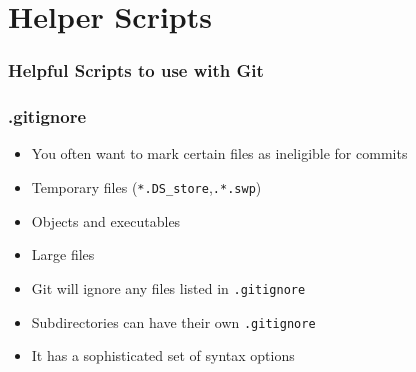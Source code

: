 \documentclass{beamer}
\begin{document}
\section{Helper Scripts}
\begin{frame}[fragile]
\frametitle{Helpful Scripts to use with Git}
\end{frame}

\begin{frame}[fragile]
\frametitle{.gitignore}
\begin{itemize}
\item You often want to mark certain files as ineligible for commits
\item Temporary files (\lstinline{*.DS_store},\lstinline{.*.swp})
\item Objects and executables
\item Large files
\item Git will ignore any files listed in \lstinline{.gitignore}
\item Subdirectories can have their own \lstinline{.gitignore}
\item It has a sophisticated set of syntax options
\end{itemize}
\end{frame}
\end{document}
